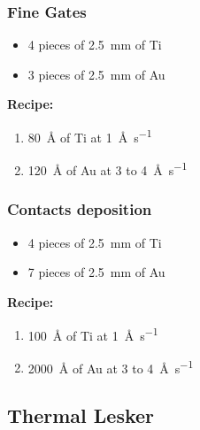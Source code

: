 \subsubsection{Fine Gates}
\begin{itemize}
\item 4 pieces of \SI{2.5}{\milli\meter} of Ti
\item 3 pieces of \SI{2.5}{\milli\meter} of Au
\end{itemize}

\textbf{Recipe: }
\begin{enumerate}[label=\protect\nth{\value*} layer: ,noitemsep,leftmargin=10em]
\item \SI{80}{\angstrom} of Ti at \SI{1}{\angstrom\per\second}
\item \SI{120}{\angstrom} of Au at 3 to \SI{4}{\angstrom\per\second}
\end{enumerate}


\subsubsection{Contacts deposition}
\begin{itemize}
\item 4 pieces of \SI{2.5}{\milli\meter} of Ti
\item 7 pieces of \SI{2.5}{\milli\meter} of Au
\end{itemize}

\textbf{Recipe: }
\begin{enumerate}[label=\protect\nth{\value*} layer: ,noitemsep,leftmargin=10em]
\item \SI{100}{\angstrom} of Ti at \SI{1}{\angstrom\per\second}
\item \SI{2000}{\angstrom} of Au at 3 to \SI{4}{\angstrom\per\second}
\end{enumerate}

\newpage

\subsection{Thermal Lesker}

